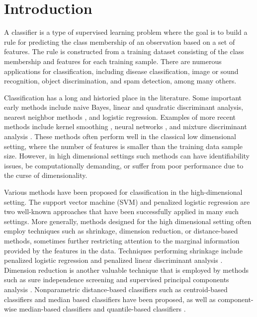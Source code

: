 
\section{Introduction}
\label{sec:intro}

A classifier is a type of supervised learning problem where the goal is to build
a rule for predicting the class membership of an observation based on a set of
features.  The rule is constructed from a training dataset consisting of the
class membership and features for each training sample.  There are numerous
applications for classification, including disease classification, image or
sound recognition, object discrimination, and spam detection, among many others.

Classification has a long and historied place in the literature.  Some important
early methods include naive Bayes, linear and quadratic discriminant analysis,
nearest neighbor methods \cite{cover1967}, and logistic regression.  Examples of
more recent methods include kernel smoothing \cite{mika1999}, neural networks
\cite{ripley1994}, and mixture discriminant analysis \cite{hastie1996}.  These
methods often perform well in the classical low dimensional setting, where the
number of features is smaller than the training data sample size.  However, in
high dimensional settings such methods can have identifiability issues, be
computationally demanding, or suffer from poor performance due to the curse of
dimensionality.

Various methods have been proposed for classification in the high-dimensional
setting.  The support vector machine (SVM) \cite{cortes1995} and penalized
logistic regression \cite{park2007} are two well-known approaches that have been
successfully applied in many such settings.  More generally, methods designed
for the high dimensional setting often employ techniques such as shrinkage,
dimension reduction, or distance-based methods, sometimes further restricting
attention to the marginal information provided by the features in the data.
Techniques performing shrinkage include penalized logistic regression and
penalized linear discriminant analysis \cite{tibshirani2002, clemmensen2011,
  witten2011}.  Dimension reduction is another valuable technique that is
employed by methods such as sure independence screening \cite{fan2008} and
supervised principal components analysis \cite{bair2006}.  Nonparametric
distance-based classifiers such as centroid-based classifiers
\cite{tibshirani2002} and median based classifiers \cite{jornsten2004,
  ghosh2005} have been proposed, as well as component-wise median-based
classifiers \cite{hall2012} and quantile-based classifiers \cite{hennig2016}.

